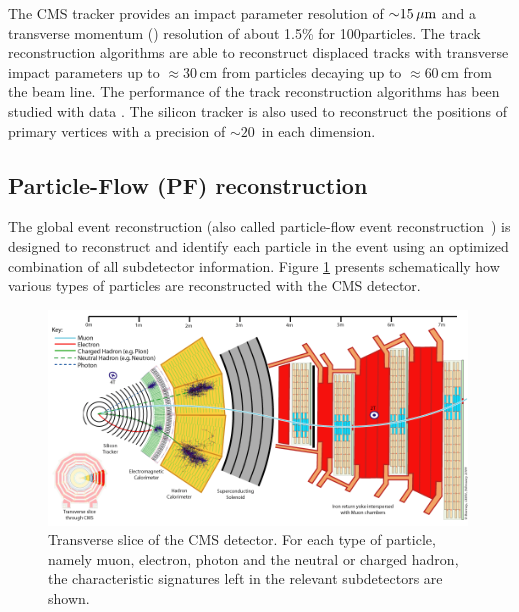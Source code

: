 The CMS tracker provides an impact parameter resolution of ${\sim}15\,\mu\text{m}$ and a transverse momentum (\pt) resolution of about 1.5\% for 100\GeV particles. 
The track reconstruction algorithms are able to reconstruct displaced tracks with transverse impact
parameters up to ${\approx}30$\,cm from particles decaying up to ${\approx}60$\,cm from the beam line.  The
performance of the track reconstruction algorithms has been studied with data
\cite{Khachatryan:2010pw}. 
The silicon
tracker is also used to reconstruct the positions of primary vertices with a
precision of ${\sim}20$~\mum in each dimension.

\subsection{Particle-Flow (PF) reconstruction}

The global event reconstruction (also called particle-flow event reconstruction~\cite{CMS-PAS-PFT-09-001,CMS-PAS-PFT-10-001}) is designed to reconstruct and identify each particle in the event using an optimized combination of all subdetector information.
Figure \ref{fig:cmsslice} presents schematically how various types of particles are reconstructed
with the CMS detector.

\begin{figure}[htbp]
\centering
\includegraphics[width=0.99\textwidth]{plots/intro/CMS_Slice.png}
\caption{Transverse slice of the CMS detector. For each type of particle, namely muon, electron,
 photon and the neutral or charged hadron, the characteristic
signatures left in the relevant subdetectors are shown. \label{fig:cmsslice}}
\end{figure}
 
